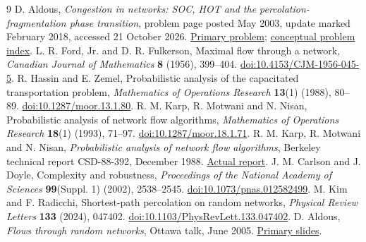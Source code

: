 \documentclass[10pt]{article}
\begin{document}
\begin{thebibliography}{9}
D. Aldous, \emph{Congestion in networks: SOC, HOT and the
percolation-fragmentation phase transition}, problem page posted May 2003,
update marked February 2018, accessed 21 October 2026.
\href{https://www.stat.berkeley.edu/~aldous/Research/OP/congestion.html}{Primary problem};
\href{https://www.stat.berkeley.edu/~aldous/Research/OP/index.html}{conceptual problem index}.
L. R. Ford, Jr. and D. R. Fulkerson, Maximal flow through a network,
\emph{Canadian Journal of Mathematics} \textbf{8} (1956), 399--404.
\href{https://doi.org/10.4153/CJM-1956-045-5}{doi:10.4153/CJM-1956-045-5}.
R. Hassin and E. Zemel, Probabilistic analysis of the capacitated
transportation problem, \emph{Mathematics of Operations Research}
\textbf{13}(1) (1988), 80--89.
\href{https://doi.org/10.1287/moor.13.1.80}{doi:10.1287/moor.13.1.80}.
R. M. Karp, R. Motwani and N. Nisan, Probabilistic analysis of network
flow algorithms, \emph{Mathematics of Operations Research}
\textbf{18}(1) (1993), 71--97.
\href{https://doi.org/10.1287/moor.18.1.71}{doi:10.1287/moor.18.1.71}.
R. M. Karp, R. Motwani and N. Nisan, \emph{Probabilistic analysis of network
flow algorithms}, Berkeley technical report CSD-88-392, December 1988.
\href{https://www2.eecs.berkeley.edu/Pubs/TechRpts/1988/CSD-88-392.pdf}{Actual report}.
J. M. Carlson and J. Doyle, Complexity and robustness,
\emph{Proceedings of the National Academy of Sciences}
\textbf{99}(Suppl. 1) (2002), 2538--2545.
\href{https://doi.org/10.1073/pnas.012582499}{doi:10.1073/pnas.012582499}.
M. Kim and F. Radicchi, Shortest-path percolation on random networks,
\emph{Physical Review Letters} \textbf{133} (2024), 047402.
\href{https://doi.org/10.1103/PhysRevLett.133.047402}{doi:10.1103/PhysRevLett.133.047402}.
D. Aldous, \emph{Flows through random networks}, Ottawa talk, June 2005.
\href{https://www.stat.berkeley.edu/~aldous/Talks/Ottawa.pdf}{Primary slides}.
\end{thebibliography}
\end{document}
